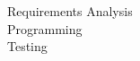 \documentclass[preview]{standalone}
\begin{document}
Requirements Analysis\\Programming\\Testing\\
\end{document}
